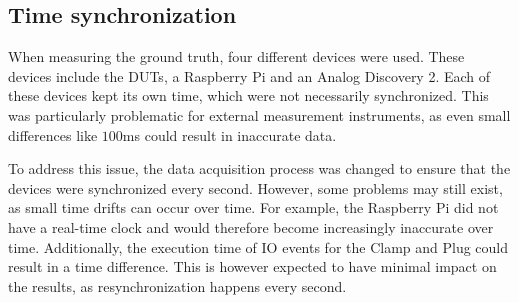 \subsection{Time synchronization}

When measuring the ground truth, four different devices were used. These devices include the DUTs, a Raspberry Pi and an Analog Discovery 2. Each of these devices kept its own time, which were not necessarily synchronized. This was particularly problematic for external measurement instruments, as even small differences like $100$ms could result in inaccurate data.

To address this issue, the data acquisition process was changed to ensure that the devices were synchronized every second. However, some problems may still exist, as small time drifts can occur over time. For example, the Raspberry Pi did not have a real-time clock\cite{RTCRasp} and would therefore become increasingly inaccurate over time. Additionally, the execution time of IO events for the Clamp and Plug could result in a time difference. This is however expected to have minimal impact on the results, as resynchronization happens every second.


